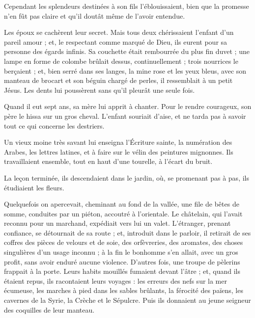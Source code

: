 \documentclass[]{book}
\begin{document}
                Cependant les splendeurs destinées à son fils l'éblouissaient, bien que la promesse n'en fût pas claire et qu'il doutât même de l'avoir entendue.
                    
                Les époux se cachèrent leur secret. Mais tous deux chérissaient l'enfant d'un pareil amour ; et, le respectant comme marqué de Dieu, ils eurent pour sa personne des égards infinis. Sa couchette était rembourrée du plus fin duvet ; une lampe en forme de colombe brûlait dessus, continuellement ; trois nourrices le berçaient ; et, bien serré dans ses langes, la mine rose et les yeux bleus, avec son manteau de brocart et son béguin chargé de perles, il ressemblait à un petit Jésus. Les dents lui poussèrent sans qu'il pleurât une seule fois.
                    
                Quand il eut sept ans, sa mère lui apprit à chanter. Pour le rendre courageux, son père le hissa sur un gros cheval. L'enfant souriait d'aise, et ne tarda pas à savoir tout ce qui concerne les destriers.
                    
                Un vieux moine très savant lui enseigna l'Écriture sainte, la numération des Arabes, les lettres latines, et à faire sur le vélin des peintures mignonnes. Ils travaillaient ensemble, tout en haut d'une tourelle, à l'écart du bruit.
                    
                La leçon terminée, ils descendaient dans le jardin, où, se promenant pas à pas, ils étudiaient les fleurs.
                    
                Quelquefois on apercevait, cheminant au fond de la vallée, une file de bêtes de somme, conduites par un piéton, accoutré à l'orientale. Le châtelain, qui l'avait reconnu pour un marchand, expédiait vers lui un valet. L'étranger, prenant confiance, se détournait de sa route ; et, introduit dans le parloir, il retirait de ses coffres des pièces de velours et de soie, des orfèvreries, des aromates, des choses singulières d'un usage inconnu ; à la fin le bonhomme s'en allait, avec un gros profit, sans avoir enduré aucune violence. D'autres fois, une troupe de pèlerins frappait à la porte. Leurs habits mouillés fumaient devant l'âtre ; et, quand ils étaient repus, ils racontaient leurs voyages : les erreurs des nefs sur la mer écumeuse, les marches à pied dans les sables brûlants, la férocité des païens, les cavernes de la Syrie, la Crèche et le Sépulcre. Puis ils donnaient au jeune seigneur des coquilles de leur manteau.
                    
\end{document}
